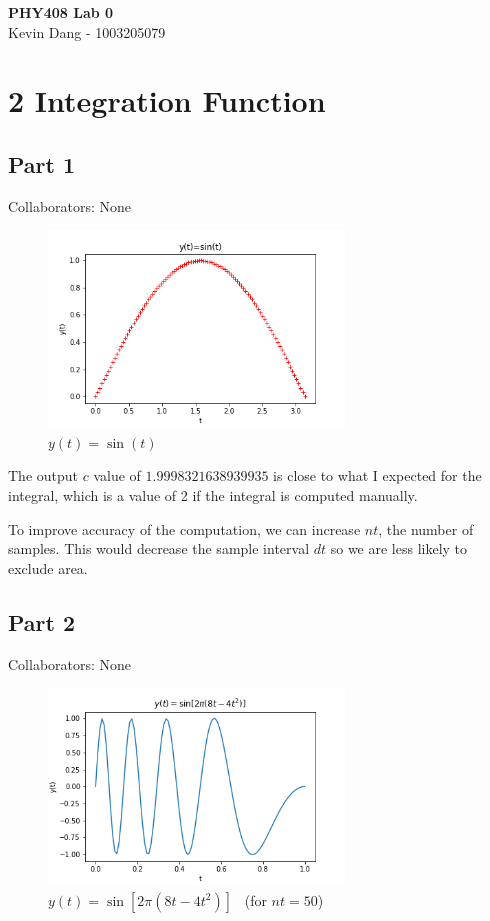\documentclass[12pt,a4paper]{article}
\begin{document}
\thispagestyle{empty}

\begin{center}
\LARGE\textbf{PHY408 Lab 0} \\
\vspace{5mm}
\Large Kevin Dang - 1003205079	
\end{center}

\vspace{5mm}

\section*{2 Integration Function}

\subsection*{Part 1}
Collaborators: None
\begin{figure}[H]
    \centering
    \includegraphics[width=0.7\textwidth]{fig1.png}
    \caption{$y(t) = \sin(t)$}
\end{figure}

The output $c$ value of $1.9998321638939935$ is close to what I expected for the integral, which is a value of 2 if the integral is computed manually.

To improve accuracy of the computation, we can increase $nt$, the number of samples. This would decrease the sample interval $dt$ so we are less likely to exclude area.

\newpage
\subsection*{Part 2}
Collaborators: None
\begin{figure}[H]
    \centering
    \includegraphics[width=0.7\textwidth]{fig2.png}
    \caption{$y(t) = \sin[2\pi(8t-4t^2)]$ \ (for $nt=50$)}
\end{figure}
\end{document}
